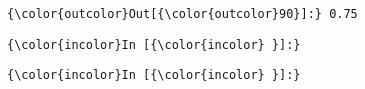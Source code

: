 \documentclass[11pt]{article}
\begin{document}
\begin{Verbatim}[commandchars=\\\{\}]
{\color{outcolor}Out[{\color{outcolor}90}]:} 0.75
\end{Verbatim}
            
    \begin{Verbatim}[commandchars=\\\{\}]
{\color{incolor}In [{\color{incolor} }]:} 
\end{Verbatim}

    \begin{Verbatim}[commandchars=\\\{\}]
{\color{incolor}In [{\color{incolor} }]:} 
\end{Verbatim}


    
    
    
    
\end{document}
